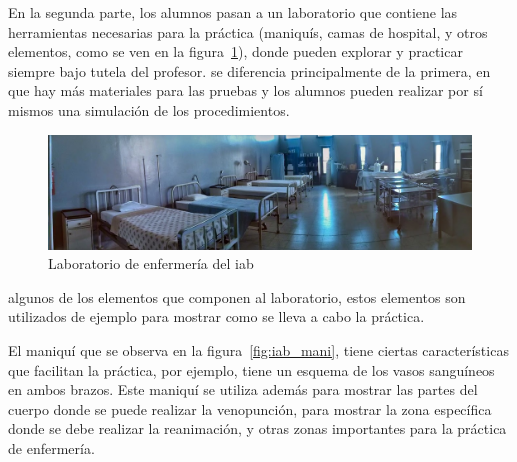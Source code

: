 En la segunda parte, los alumnos pasan a un laboratorio que contiene las
herramientas necesarias para la práctica (maniquís, camas de hospital, y otros
elementos, como se ven en la figura~\ref{fig:iab_lab}), donde pueden explorar y
practicar siempre bajo tutela del profesor.  se diferencia
principalmente de la primera, en que hay más materiales para las pruebas y los
alumnos pueden realizar por sí mismos una simulación de los procedimientos.

\begin{figure}[h!t] 
\centering 
\includegraphics[scale=0.3,natwidth=100,natheight=100]{problema/iab_sala_1.jpg}
\caption{Laboratorio de enfermería del \Gls{iab}}
\label{fig:iab_lab}
\end{figure}

 algunos de los elementos que componen al
laboratorio, estos elementos son utilizados de ejemplo para mostrar como se
lleva a cabo la práctica.


El maniquí que se observa en la figura~\ref{fig:iab_mani}, tiene ciertas
características que facilitan la práctica, por ejemplo, tiene un esquema de los
vasos sanguíneos en ambos brazos. Este maniquí se utiliza además para mostrar
las partes del cuerpo donde se puede realizar la venopunción, para mostrar la
zona específica donde se debe realizar la reanimación, y otras zonas importantes
para la práctica de enfermería.


